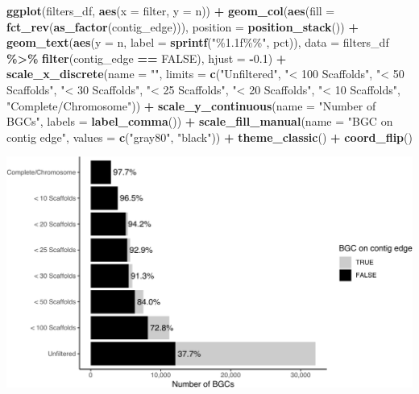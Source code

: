 \documentclass[
]{article}
\newenvironment{Shaded}{\begin{snugshade}}{\end{snugshade}}
\newcommand{\AttributeTok}[1]{\textcolor[rgb]{0.13,0.29,0.53}{#1}}
\newcommand{\ConstantTok}[1]{\textcolor[rgb]{0.56,0.35,0.01}{#1}}
\newcommand{\FloatTok}[1]{\textcolor[rgb]{0.00,0.00,0.81}{#1}}
\newcommand{\FunctionTok}[1]{\textcolor[rgb]{0.13,0.29,0.53}{\textbf{#1}}}
\newcommand{\NormalTok}[1]{#1}
\newcommand{\SpecialCharTok}[1]{\textcolor[rgb]{0.81,0.36,0.00}{\textbf{#1}}}
\newcommand{\StringTok}[1]{\textcolor[rgb]{0.31,0.60,0.02}{#1}}
\begin{document}
\begin{Shaded}
\begin{Highlighting}[]
\FunctionTok{ggplot}\NormalTok{(filters\_df, }\FunctionTok{aes}\NormalTok{(}\AttributeTok{x =}\NormalTok{ filter, }\AttributeTok{y =}\NormalTok{ n)) }\SpecialCharTok{+}
  \FunctionTok{geom\_col}\NormalTok{(}\FunctionTok{aes}\NormalTok{(}\AttributeTok{fill =} \FunctionTok{fct\_rev}\NormalTok{(}\FunctionTok{as\_factor}\NormalTok{(contig\_edge))), }\AttributeTok{position =} \FunctionTok{position\_stack}\NormalTok{()) }\SpecialCharTok{+}
  \FunctionTok{geom\_text}\NormalTok{(}\FunctionTok{aes}\NormalTok{(}\AttributeTok{y =}\NormalTok{ n, }\AttributeTok{label =} \FunctionTok{sprintf}\NormalTok{(}\StringTok{"\%1.1f\%\%"}\NormalTok{, pct)), }\AttributeTok{data =}\NormalTok{ filters\_df }\SpecialCharTok{\%\textgreater{}\%} \FunctionTok{filter}\NormalTok{(contig\_edge }\SpecialCharTok{==} \ConstantTok{FALSE}\NormalTok{), }\AttributeTok{hjust =} \SpecialCharTok{{-}}\FloatTok{0.1}\NormalTok{) }\SpecialCharTok{+}
  \FunctionTok{scale\_x\_discrete}\NormalTok{(}\AttributeTok{name =} \StringTok{""}\NormalTok{, }\AttributeTok{limits =} \FunctionTok{c}\NormalTok{(}\StringTok{"Unfiltered"}\NormalTok{, }\StringTok{"\textless{} 100 Scaffolds"}\NormalTok{, }\StringTok{"\textless{} 50 Scaffolds"}\NormalTok{, }\StringTok{"\textless{} 30 Scaffolds"}\NormalTok{, }\StringTok{"\textless{} 25 Scaffolds"}\NormalTok{, }\StringTok{"\textless{} 20 Scaffolds"}\NormalTok{, }\StringTok{"\textless{} 10 Scaffolds"}\NormalTok{, }\StringTok{"Complete/Chromosome"}\NormalTok{)) }\SpecialCharTok{+}
  \FunctionTok{scale\_y\_continuous}\NormalTok{(}\AttributeTok{name =} \StringTok{"Number of BGCs"}\NormalTok{, }\AttributeTok{labels =} \FunctionTok{label\_comma}\NormalTok{()) }\SpecialCharTok{+}
  \FunctionTok{scale\_fill\_manual}\NormalTok{(}\AttributeTok{name =} \StringTok{"BGC on contig edge"}\NormalTok{, }\AttributeTok{values =} \FunctionTok{c}\NormalTok{(}\StringTok{"gray80"}\NormalTok{, }\StringTok{"black"}\NormalTok{)) }\SpecialCharTok{+}
  \FunctionTok{theme\_classic}\NormalTok{() }\SpecialCharTok{+}
  \FunctionTok{coord\_flip}\NormalTok{()}
\end{Highlighting}
\end{Shaded}

\includegraphics{analysis_files/figure-latex/unnamed-chunk-4-1.pdf}
\end{document}
